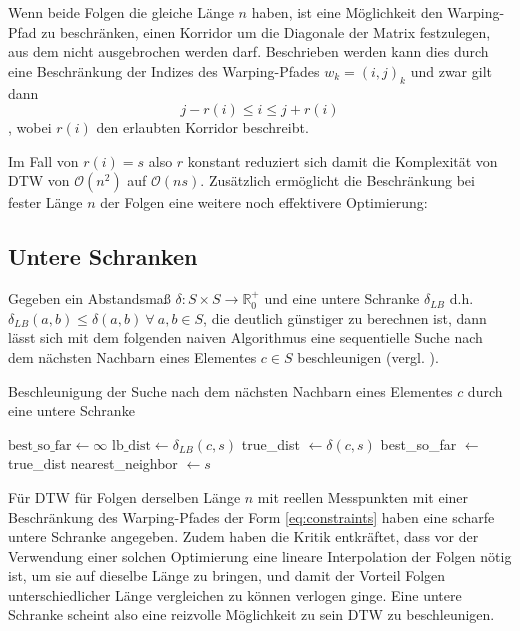 Wenn beide Folgen die gleiche Länge $n$ haben, ist eine Möglichkeit den Warping-Pfad zu beschränken, einen Korridor um die Diagonale der Matrix festzulegen, aus dem nicht ausgebrochen werden darf. Beschrieben werden kann dies durch eine Beschränkung der Indizes des Warping-Pfades \( w_k = (i,j)_k \) und zwar gilt dann
\begin{equation}
  \label{eq:constraints}
  j−r(i) \leq i \leq j+r(i)
\end{equation}
, wobei $r(i)$ den erlaubten Korridor beschreibt.

Im Fall von \(r(i) = s\) also $r$ konstant reduziert sich damit die Komplexität von DTW von \( \mathcal{O}(n^2) \) auf \( \mathcal{O}(ns) \). Zusätzlich ermöglicht die Beschränkung bei fester Länge $n$ der Folgen eine weitere noch effektivere Optimierung:

\subsection{Untere Schranken} %
\label{sub:lower_bounding}

Gegeben ein Abstandsmaß \( \delta : S\times S \rightarrow \mathbb{R}_0^+ \) und eine untere Schranke \( \delta_{LB} \) d.h. \( \delta_{LB}(a,b) \leq \delta(a,b) ~\forall~ a,b \in S \), die deutlich günstiger zu berechnen ist, dann lässt sich mit dem folgenden naiven Algorithmus eine sequentielle Suche nach dem nächsten Nachbarn eines Elementes \( c \in S \) beschleunigen (vergl. \cite{Keogh:2005p7751}).

\begin{algorithm}
  \caption{Beschleunigung der Suche nach dem nächsten Nachbarn eines Elementes \(c\) durch eine untere Schranke}
  \begin{algorithmic}
    \STATE $\text{best\_so\_far} \gets \infty$
      \STATE $\text{lb\_dist} \gets \delta_{LB}(c,s)$
        \STATE true\_dist $\gets \delta(c,s)$
          \STATE best\_so\_far $\gets$ true\_dist
          \STATE nearest\_neighbor $\gets s$
        \ENDIF
      \ENDIF
    \ENDFOR
  \end{algorithmic}
\end{algorithm}

Für DTW für Folgen derselben Länge $n$ mit reellen Messpunkten mit einer Beschränkung des Warping-Pfades der Form \ref{eq:constraints} haben \citet{Keogh:2005p7751} eine scharfe untere Schranke angegeben. Zudem haben \citet{Ratanamahatana:2004p7522} die Kritik entkräftet, dass vor der Verwendung einer solchen Optimierung eine lineare Interpolation der Folgen nötig ist, um sie auf dieselbe Länge zu bringen, und damit der Vorteil Folgen unterschiedlicher Länge vergleichen zu können verlogen ginge. Eine untere Schranke scheint also eine reizvolle Möglichkeit zu sein DTW zu beschleunigen.

